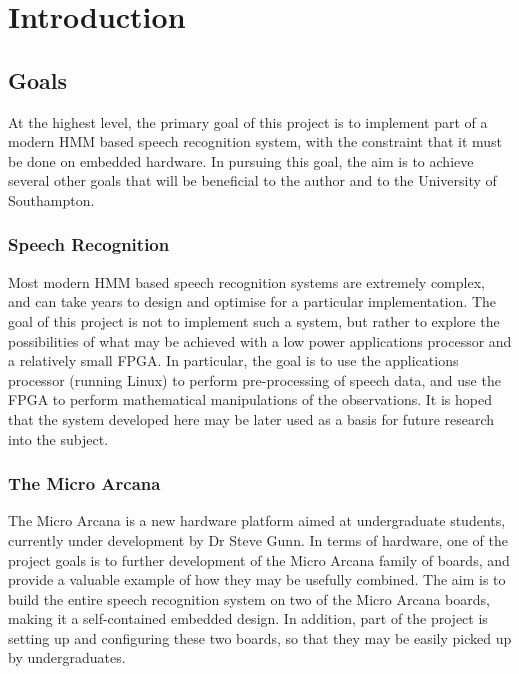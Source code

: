 \chapter{Introduction} %
\label{cha:introduction}


\section{Goals} %
\label{sec:goals}
	At the highest level, the primary goal of this project is to implement part of a modern HMM based speech recognition system, with the constraint that it must be done on embedded hardware.  In pursuing this goal, the aim is to achieve several other goals that will be beneficial to the author and to the University of Southampton.

	\subsection{Speech Recognition} %
	\label{sec:speech_recognition}
		Most modern HMM based speech recognition systems are extremely complex, and can take years to design and optimise for a particular implementation.  The goal of this project is not to implement such a system, but rather to explore the possibilities of what may be achieved with a low power applications processor and a relatively small FPGA.  In particular, the goal is to use the applications processor (running Linux) to perform pre-processing of speech data, and use the FPGA to perform mathematical manipulations of the observations.  It is hoped that the system developed here may be later used as a basis for future research into the subject.

	\subsection{The Micro Arcana} %
	\label{sec:the_micro_arcana}
		The Micro Arcana is a new hardware platform aimed at undergraduate students, currently under development by Dr Steve Gunn.  
		In terms of hardware, one of the project goals is to further development of the Micro Arcana family of boards, and provide a valuable example of how they may be usefully combined.  The aim is to build the entire speech recognition system on two of the Micro Arcana boards, making it a self-contained embedded design.  In addition, part of the project is setting up and configuring these two boards, so that they may be easily picked up by undergraduates.

